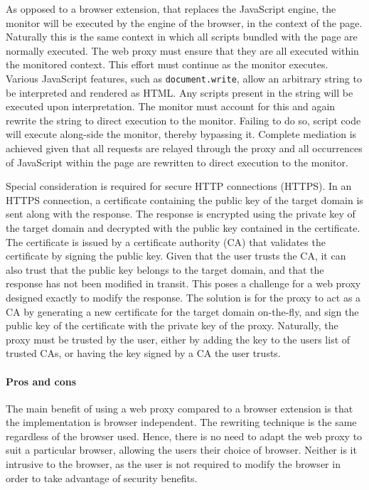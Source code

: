 \documentclass{llncs}
\newcommand{\todo}[1]{\colorbox{red}{\textcolor{white}{\sffamily\bfseries\scriptsize TODO}} \textcolor{red}{#1} \textcolor{red}{$\blacktriangleleft$}}
\begin{document}
As opposed to a browser extension, that replaces the 
JavaScript engine, the monitor will be executed by the engine of the browser, in the context of the page. Naturally 
this is the same context in which all scripts bundled with the 
page are normally executed. The web proxy must ensure that they are all executed within the 
monitored context. This effort must continue as the monitor executes. 
Various JavaScript features, such as 
\lstinline{document.write}, allow an arbitrary string to be 
interpreted and rendered as HTML. Any scripts present in the string will be 
executed upon interpretation. The monitor must account for this and again rewrite 
the string to direct execution to the monitor. Failing to do so, script code will execute 
along-side the monitor, thereby bypassing it. 
Complete mediation is achieved given that all requests are relayed through the proxy 
and all occurrences of JavaScript within the page are rewritten to direct execution to the monitor.

Special consideration is required for secure HTTP connections (HTTPS). In an HTTPS 
connection, a certificate containing the public key of the target domain is sent 
along with the response. The response is encrypted using the private key of the target 
domain and decrypted with the public key contained in the certificate. The 
certificate is issued by a certificate authority (CA)
that validates the certificate by signing the public key. Given that the user 
trusts the CA, it can also trust that the public key belongs 
to the target domain, and that the response has not been modified in transit.
This poses a challenge for a web proxy designed exactly to modify the response. The solution 
is for the proxy to act as a CA by generating a
new certificate for the target domain on-the-fly, and sign the 
public key of the certificate with the private key of the proxy. Naturally, 
the proxy must be trusted by the user, either by adding the key to 
the users list of trusted CAs, or having the key signed by a CA the user trusts.



\paragraph{Pros and cons}
The main benefit of using a web proxy 
compared to a browser extension is that the implementation is browser independent. The 
rewriting technique is the same regardless of the browser used. Hence, there is no 
need to adapt the web proxy to suit a particular browser, allowing 
the users their choice of browser.
Neither is it intrusive to the browser, as the user is not required to modify the 
browser in order to take advantage of security benefits. 
\end{document}
